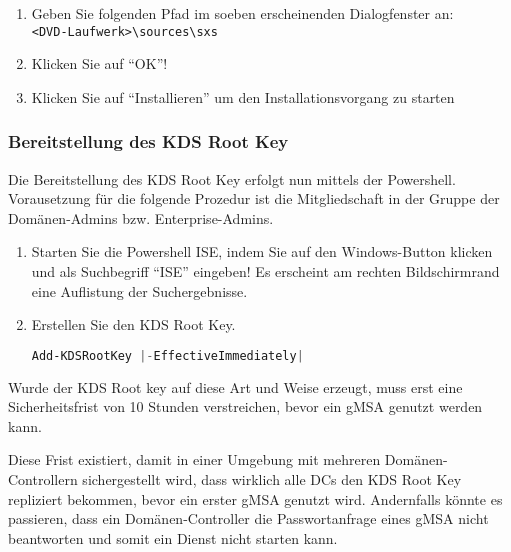 \begin{enumerate}
{              3}{sql_server_install_dotnetfx35_2}{0.42}
\clearpage
              \item Geben Sie folgenden Pfad im soeben erscheinenden Dialogfenster
              an:
              \\
              \texttt{<DVD-Laufwerk>\textbackslash sources\textbackslash sxs}
              \item Klicken Sie auf \enquote{OK}!
              \item Klicken Sie auf \enquote{Installieren} um den
              Installationsvorgang zu starten
          \end{enumerate}
        \subsubsection{Bereitstellung des KDS Root Key}
          Die Bereitstellung des KDS Root Key erfolgt nun mittels der Powershell.
          Vorausetzung für die folgende Prozedur ist die Mitgliedschaft in der
          Gruppe der Domänen-Admins bzw. Enterprise-Admins.
          \begin{enumerate}
              \item Starten Sie die Powershell ISE, indem Sie auf den Windows-Button
              klicken und als Suchbegriff \enquote{ISE} eingeben! Es erscheint am
              rechten Bildschirmrand eine Auflistung der Suchergebnisse.
              \item Erstellen Sie den KDS Root Key.
              \begin{lstlisting}[language=powershell, caption={Erstellen eines KDS
              Root Keys}, label=create_kds_root_key]
Add-KDSRootKey |-EffectiveImmediately|
              \end{lstlisting}
            \end{enumerate}
          \begin{merke}
            Wurde der KDS Root key auf diese Art und Weise erzeugt, muss erst eine
            Sicherheitsfrist von 10 Stunden verstreichen, bevor ein gMSA genutzt
            werden kann.
          \end{merke}
          Diese Frist existiert, damit in einer Umgebung mit mehreren
          Domänen-Controllern sichergestellt wird, dass wirklich alle DCs den KDS
          Root Key repliziert bekommen, bevor ein erster gMSA genutzt wird.
          Andernfalls könnte es passieren, dass ein Domänen-Controller die
          Passwortanfrage eines gMSA nicht beantworten und somit ein Dienst nicht
          starten kann.
  
